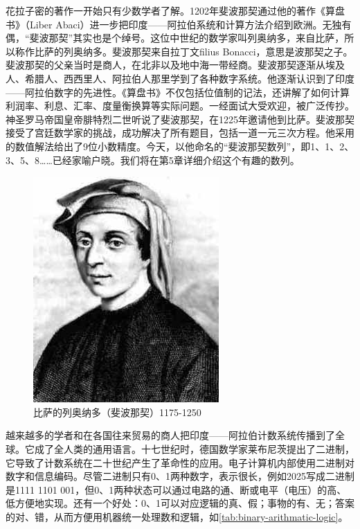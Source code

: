 \documentclass[b5paper]{ctexart}
\begin{document}
花拉子密的著作一开始只有少数学者了解。1202年斐波那契通过他的著作《算盘书》（Liber Abaci）进一步把印度——阿拉伯系统和计算方法介绍到欧洲。无独有偶，“斐波那契”其实也是个绰号。这位中世纪的数学家叫列奥纳多，来自比萨，所以称作比萨的列奥纳多。斐波那契来自拉丁文filius Bonacci，意思是波那契之子。斐波那契的父亲当时是商人，在北非以及地中海一带经商。斐波那契逐渐从埃及人、希腊人、西西里人、阿拉伯人那里学到了各种数字系统。他逐渐认识到了印度——阿拉伯数字的先进性。《算盘书》不仅包括位值制的记法，还讲解了如何计算利润率、利息、汇率、度量衡换算等实际问题。一经面试大受欢迎，被广泛传抄。神圣罗马帝国皇帝腓特烈二世听说了斐波那契，在1225年邀请他到比萨。斐波那契接受了宫廷数学家的挑战，成功解决了所有题目，包括一道一元三次方程。他采用的数值解法给出了9位小数精度\cite{Gies-Carney-24}。今天，以他命名的“斐波那契数列”，即1、1、2、3、5、8……已经家喻户晓。我们将在第5章详细介绍这个有趣的数列。

\begin{figure}[htbp]
 \centering
 \includegraphics[scale=0.35]{img/Fibonacci}
 \caption{比萨的列奥纳多（斐波那契）1175-1250}
 \label{fig:Fibonacci}
\end{figure}

\label{sec:binary-numerals}  
越来越多的学者和在各国往来贸易的商人把印度——阿拉伯计数系统传播到了全球。它成了全人类的通用语言。十七世纪时，德国数学家莱布尼茨提出了二进制，它导致了计数系统在二十世纪产生了革命性的应用。电子计算机内部使用二进制对数字和信息编码。尽管二进制只有0、1两种数字，表示很长，例如2025写成二进制是1111 1101 001，但0、1两种状态可以通过电路的通、断或电平（电压）的高、低方便地实现。还有一个好处：0、1可以对应逻辑的真、假；事物的有、无；答案的对、错，从而方便用机器统一处理数和逻辑，如\cref{tab:binary-arithmatic-logic}。
\end{document}
